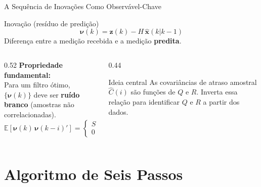 \documentclass[aspectratio=169]{beamer}
\begin{document}
\begin{frame}{A Sequência de Inovações Como Observável-Chave}
    \begin{block}{Inovação (resíduo de predição)}
        \[
            \boldsymbol{\nu}(k) = \mathbf{z}(k) - H\,\hat{\mathbf{x}}(k|k{-}1)
        \]
        Diferença entre a medição recebida e a medição \textbf{predita}.
    \end{block}
    \vspace{0.2cm}
    \begin{columns}[T]
        \begin{column}{0.52\textwidth}
            \textbf{Propriedade fundamental:}\\
            Para um filtro ótimo, $\{\boldsymbol{\nu}(k)\}$ deve ser
            \textbf{ruído branco} (amostras não correlacionadas).
            \[
                \mathbb{E}[\boldsymbol{\nu}(k)\,\boldsymbol{\nu}(k{-}i)'] =
                \begin{cases} S & i=0 \\ 0 & i\geq 1 \end{cases}
            \]
        \end{column}
        \begin{column}{0.44\textwidth}
            \begin{alertblock}{Ideia central}
                As covariâncias de atraso amostral
                $\hat{C}(i)$ são funções de $Q$ e $R$.
                Inverta essa relação para identificar
                $Q$ e $R$ a partir dos dados.
            \end{alertblock}
        \end{column}
    \end{columns}
\end{frame}

\section{Algoritmo de Seis Passos}
\end{document}
